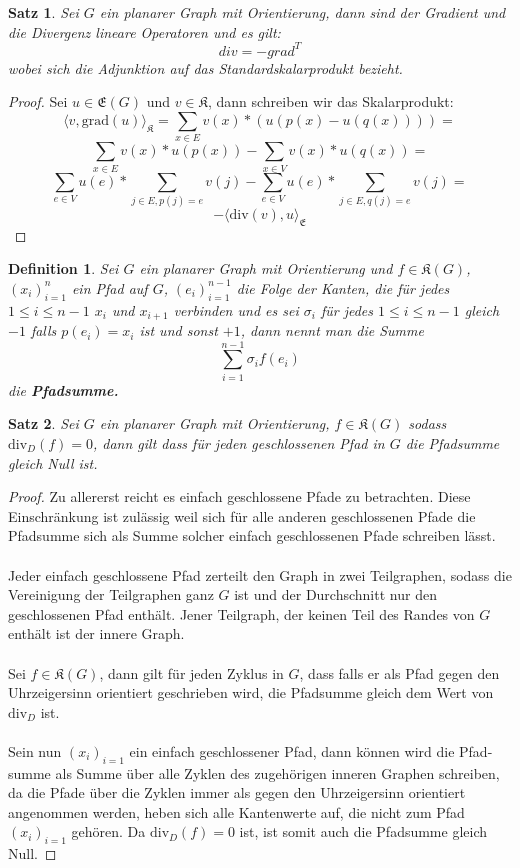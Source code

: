 \documentclass[11pt,a4paper,leqno]{report}
\newtheorem{proposition}{Satz}[chapter]
\newtheorem{definition}[theorem]{Definition}
\numberwithin{equation}{chapter}
\begin{document}
\begin{proposition}
		Sei $G$ ein planarer Graph mit Orientierung, dann sind der Gradient und die Divergenz lineare Operatoren und es gilt:
		$$div = -grad^T$$
		wobei sich die Adjunktion auf das Standardskalarprodukt bezieht.
\end{proposition}
\begin{proof}
Sei $u\in\mathfrak{E}(G)$ und $v\in \mathfrak{K}$, dann schreiben wir das Skalarprodukt:
$$\langle v, \text{grad}(u)\rangle_\mathfrak{K} = \sum_{x\in E} v(x) * (u(p(x) - u(q(x)))) = $$
$$\sum_{x\in E} v(x) * u(p(x)) - \sum_{x\in V} v(x) * u(q(x))=$$
$$\sum_{e\in V} u(e) * \sum_{j\in E, p(j)=e}v(j) - \sum_{e\in V} u(e) * \sum_{j\in E, q(j)=e}v(j) =$$
$$-\langle \text{div}(v), u\rangle_\mathfrak{E}$$
\end{proof}
\begin{definition}
	Sei $G$ ein planarer Graph mit Orientierung und $f\in\mathfrak{K}(G)$, $(x_i)_{i=1}^n$ ein Pfad auf $G$, $(e_i)_{i=1}^{n-1}$ die Folge der Kanten, die f\"ur jedes $1\leq i \leq n-1$ $x_i$ und $x_{i+1}$ verbinden und es sei $\sigma_i$ f\"ur jedes $1\leq i \leq n-1$ gleich $-1$ falls $p(e_i)=x_i$ ist und sonst $+1$, dann nennt man die Summe
	$$ \sum_{i=1}^{n-1} \sigma_i f(e_i)$$
	die \textbf{Pfadsumme.}
\end{definition}
\begin{proposition}
	Sei $G$ ein planarer Graph mit Orientierung, $f\in\mathfrak{K}(G)$ sodass $\text{div}_D(f)=0$, dann gilt dass f\"ur jeden geschlossenen Pfad in $G$ die Pfadsumme gleich Null ist.
\end{proposition}
\begin{proof}
Zu allererst reicht es einfach geschlossene Pfade zu betrachten. Diese Einschränkung ist zul\"assig weil sich f\"ur alle anderen geschlossenen Pfade die Pfadsumme sich als Summe solcher einfach geschlossenen Pfade schreiben l\"asst.\\
\\
Jeder einfach geschlossene Pfad zerteilt den Graph in zwei Teilgraphen, sodass die Vereinigung der Teilgraphen ganz $G$ ist und der Durchschnitt nur den geschlossenen Pfad enth\"alt. Jener Teilgraph, der keinen Teil des Randes von $G$ enth\"alt ist der innere Graph.\\
\\
Sei $f\in\mathfrak{K}(G)$, dann gilt f\"ur jeden Zyklus in $G$, dass falls er als Pfad gegen den Uhrzeigersinn orientiert geschrieben wird, die Pfadsumme gleich dem Wert von $\text{div}_D$ ist.\\
\\
Sein nun $(x_i)_{i=1}$ ein einfach geschlossener Pfad, dann k\"onnen wird die Pfad- summe als Summe \"uber alle Zyklen des zugeh\"origen inneren Graphen schreiben, da die Pfade \"uber die Zyklen immer als gegen den Uhrzeigersinn orientiert angenommen werden, heben sich alle Kantenwerte auf, die nicht zum Pfad $(x_i)_{i=1}$ geh\"oren.
Da $\text{div}_D(f)=0$ ist, ist somit auch die Pfadsumme gleich Null.
\end{proof}
\end{document}
